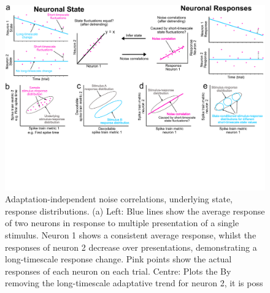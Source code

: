 \documentclass{article}
\begin{document}
\begin{figure}[t!]
\centering
\includegraphics[width=\textwidth]{Figure1.pdf}
\caption{Adaptation-independent noise correlations, underlying state, response distributions. (a) Left: Blue lines show the average response of two neurons in response to multiple presentation of a single stimulus. Neuron 1 shows a consistent average response, whilst the responses of neuron 2 decrease over presentations, demonstrating a long-timescale response change. Pink points show the actual responses of each neuron on each trial. Centre: Plots the  By removing the long-timescale adaptative trend for neuron 2, it is poss} 


\label{fig:fig1}
\end{figure}
\end{document}
